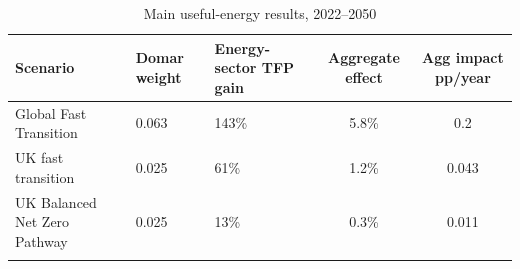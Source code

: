 \begin{longtable}{lllcc}
\caption{Main useful-energy results, 2022--2050} \\ 
  \hline
Scenario & Domar weight & Energy-sector TFP gain & Aggregate effect & Agg impact pp/year \\ 
  \hline
Global Fast Transition & 0.063 & 143\% & 5.8\% & 0.2 \\ 
  UK fast transition & 0.025 & 61\% & 1.2\% & 0.043 \\ 
  UK Balanced Net Zero Pathway & 0.025 & 13\% & 0.3\% & 0.011 \\ 
   \hline
\hline
\label{tab:energy_main_useful}
\end{longtable}
